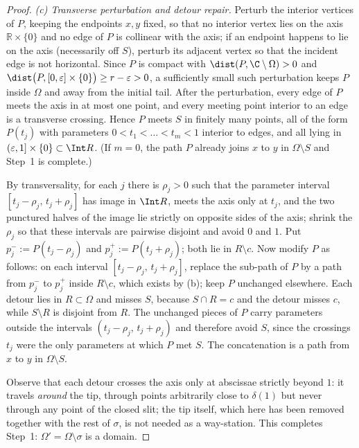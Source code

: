 \begin{proof}
\emph{(c) Transverse perturbation and detour repair.}
Perturb the interior vertices of $P$, keeping the endpoints $x,y$ fixed, so that no
interior vertex lies on the axis $\mathbb{R}\times\{0\}$ and no edge of $P$ is collinear
with the axis; if an endpoint happens to lie on the axis (necessarily off $S$), perturb
its adjacent vertex so that the incident edge is not horizontal. Since $P$ is compact
with $\dist(P,\C\setminus\Omega)>0$ and $\dist\bigl(P,[0,\varepsilon]\times\{0\}\bigr)
\ge r-\varepsilon>0$, a sufficiently small such perturbation keeps $P$ inside $\Omega$
and away from the initial tail. After the perturbation, every edge of $P$ meets the axis
in at most one point, and every meeting point interior to an edge is a transverse
crossing. Hence $P$ meets $S$ in finitely many points, all of the form $P(t_j)$ with
parameters $0<t_1<\dots<t_m<1$ interior to edges, and all lying in
$( \varepsilon,1]\times\{0\}\subset\Int R$. (If $m=0$, the path $P$ already joins $x$ to
$y$ in $\Omega\setminus S$ and Step~1 is complete.)

By transversality, for each $j$ there is $\rho_j>0$ such that the parameter interval
$[t_j-\rho_j,\,t_j+\rho_j]$ has image in $\Int R$, meets the axis only at $t_j$, and the
two punctured halves of the image lie strictly on opposite sides of the axis; shrink the
$\rho_j$ so that these intervals are pairwise disjoint and avoid $0$ and $1$. Put
$p_j^{-}:=P(t_j-\rho_j)$ and $p_j^{+}:=P(t_j+\rho_j)$; both lie in $R\setminus c$.
Now modify $P$ as follows: on each interval $[t_j-\rho_j,\,t_j+\rho_j]$, replace the
sub-path of $P$ by a path from $p_j^{-}$ to $p_j^{+}$ inside $R\setminus c$, which
exists by (b); keep $P$ unchanged elsewhere. Each detour lies in $R\subset\Omega$ and
misses $S$, because $S\cap R=c$ and the detour misses $c$, while $S\setminus R$ is
disjoint from $R$. The unchanged pieces of $P$ carry parameters outside the intervals
$(t_j-\rho_j,\,t_j+\rho_j)$ and therefore avoid $S$, since the crossings $t_j$ were the
only parameters at which $P$ met $S$. The concatenation is a path from $x$ to $y$ in
$\Omega\setminus S$.

Observe that each detour crosses the axis only at abscissae strictly beyond $1$: it
travels \emph{around} the tip, through points arbitrarily close to $\delta(1)$ but never
through any point of the closed slit; the tip itself, which here has been removed
together with the rest of $\sigma$, is not needed as a way-station. This completes
Step~1: $\Omega'=\Omega\setminus\sigma$ is a domain.


\end{proof}
